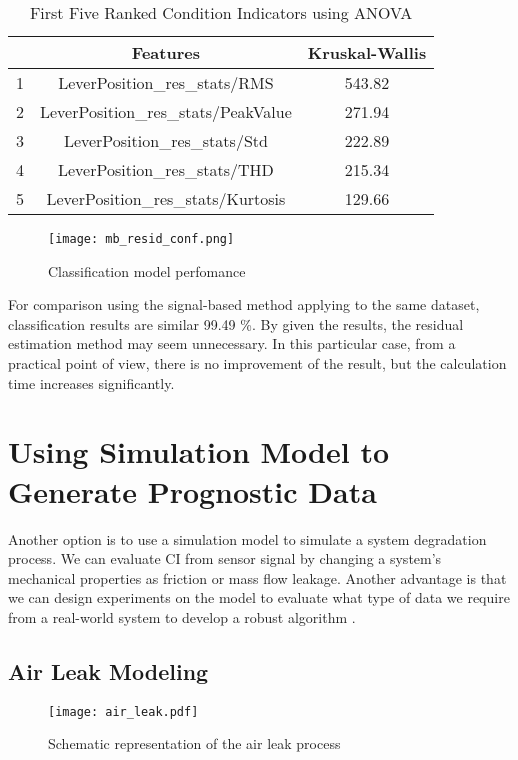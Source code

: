 \begin{table}[h!]
    \centering
    \begin{tabular}{|c|c|c|}
        \hline
          &        Features               & Kruskal-Wallis \\ \hline
        1 &   LeverPosition\_res\_stats/RMS	    & 543.82 \\ \hline  
        2 &   LeverPosition\_res\_stats/PeakValue	& 271.94 \\ \hline  
        3 &   LeverPosition\_res\_stats/Std	    & 222.89 \\ \hline  
        4 &   LeverPosition\_res\_stats/THD	    & 215.34 \\ \hline  
        5 &   LeverPosition\_res\_stats/Kurtosis	& 129.66 \\ \hline  
    \end{tabular}
    \caption{First Five Ranked Condition Indicators using ANOVA}
    \label{tab:resid_sorted_ci}
\end{table}

\begin{figure}[h!]
    \centering
    \texttt{[image: mb\_resid\_conf.png]}
    \caption{Classification model perfomance}
    \label{fig:mb_resid_conf}
\end{figure}

For comparison using the signal-based method applying to the same dataset,
classification results are similar 99.49 \%.
By given the results, the residual estimation method may seem unnecessary.
In this particular case, from a practical point of view, there is no
improvement of the result, but the calculation time increases
significantly. 


\section{Using Simulation Model to Generate Prognostic Data}\label{sec:mb_rul}
Another option is to use a simulation model to simulate a system degradation
process. We can evaluate CI from sensor signal by changing a system's
mechanical properties as friction or mass flow leakage.  Another advantage
is that we can design experiments on the model to evaluate what type of
data we require from a real-world system to develop a robust algorithm
\cite{matlab_full}.

\subsection{Air Leak Modeling}
\begin{figure}[h!]
    \centering
    \texttt{[image: air\_leak.pdf]}
    \caption{Schematic representation of the air leak process}
    \label{fig:air_leak_scheme}
\end{figure}

